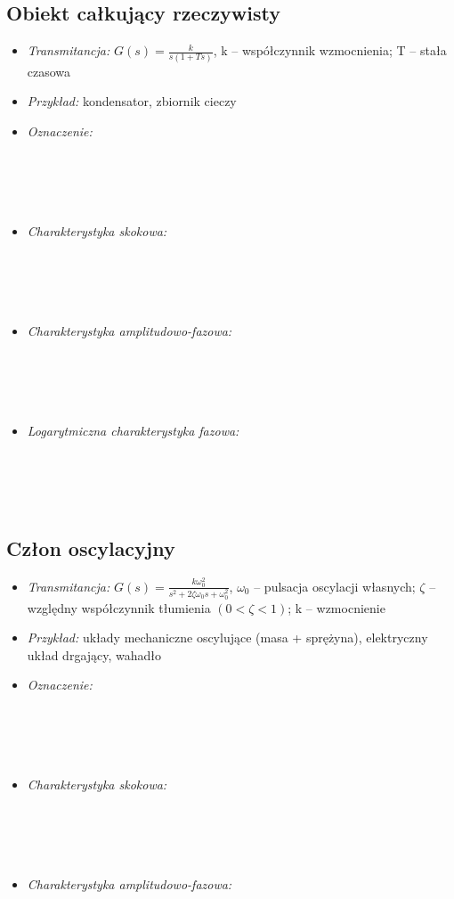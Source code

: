 \documentclass[a4paper]{article}
\begin{document}
\subsection{Obiekt całkujący rzeczywisty}
\begin{itemize}
\item \emph{Transmitancja: } $G(s) = \frac{k}{s(1+Ts)}$, k -- współczynnik wzmocnienia; T -- stała czasowa
\item \emph{Przykład: } kondensator, zbiornik cieczy
\item \emph {Oznaczenie: } \\\\\\\\\\
\item \emph{Charakterystyka skokowa: } \\\\\\\\\\
\item \emph{Charakterystyka amplitudowo-fazowa: } \\\\\\\\\\
\item \emph{Logarytmiczna charakterystyka fazowa: } \\\\\\\\\\
\end{itemize}
\subsection{Człon oscylacyjny}
\begin{itemize}
\item \emph{Transmitancja: } $G(s) = \frac{k\omega_0^2}{s^2+2\zeta\omega_0s+\omega_0^2}$, $\omega_0$ -- pulsacja oscylacji własnych; $\zeta$ -- względny współczynnik tłumienia $(0 < \zeta < 1)$; k -- wzmocnienie
\item \emph{Przykład: }  układy mechaniczne oscylujące (masa + sprężyna), elektryczny układ drgający, wahadło
\item \emph {Oznaczenie: } \\\\\\\\\\
\item \emph{Charakterystyka skokowa: } \\\\\\\\\\
\item \emph{Charakterystyka amplitudowo-fazowa: } \\\\\\\\\\
\end{itemize}
\end{document}
